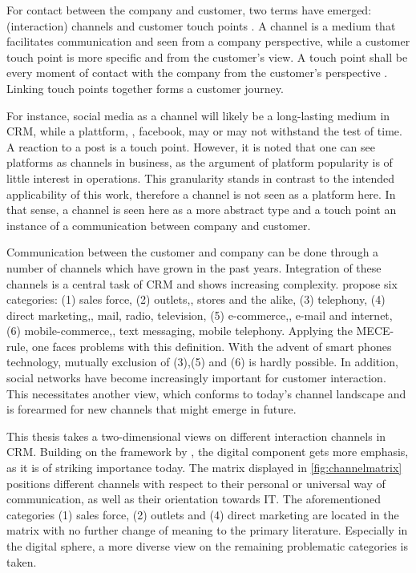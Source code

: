 		 For contact between the company and customer, two terms have emerged: (interaction) channels and customer touch points \citep{Leuer2011}. A channel is a medium that facilitates communication and seen from a company perspective, while a customer touch point is more specific and from the customer's view. A touch point shall be every moment of contact with the company from the customer's perspective \citep{Zomerdijk_2010}. Linking touch points together forms a customer journey. 
		 
		 For instance, social media as a channel will likely be a long-lasting medium in CRM, while a plattform, \ie, facebook, may or may not withstand the test of time. A reaction to a post is a touch point. 
		 However, it is noted that one can see platforms as channels in business, as the argument of platform popularity is of little interest in operations. This granularity stands in contrast to the intended applicability of this work, therefore a channel is  not seen as a platform here. 
		 In that sense, a channel is seen here as a more abstract type and a touch point an instance of a communication between company and customer. 
		
		Communication between the customer and company can be done through a number of channels which have grown in the past years. Integration of these channels is a central task of CRM and shows increasing complexity. \cite{paynefrow2005} propose six categories: (1) sales force, (2) outlets,\ie, stores and the alike, (3) telephony, (4) direct marketing,\ie, mail, radio, television, (5) e-commerce,\ie, e-mail and internet, (6) mobile-commerce,\ie, text messaging, mobile telephony. Applying the \acrfull{MECE}-rule, one faces problems with this definition. With the advent of smart phones technology, mutually exclusion of (3),(5) and (6) is hardly possible. In addition, social networks have become increasingly important for customer interaction. This necessitates another view, which conforms to today's channel landscape and is forearmed for new channels that might emerge in future. 
		
		This thesis takes a two-dimensional views on different interaction channels in CRM. Building on the framework by \citeauthor{paynefrow2005}, the digital component gets more emphasis, as it is of striking importance today. The matrix displayed in \ref{fig:channelmatrix} positions different channels with respect to their personal or universal way of communication, as well as their orientation towards IT. The aforementioned categories (1) sales force, (2) outlets and (4) direct marketing are located in the matrix with no further change of meaning to the primary literature. Especially in the digital sphere, a more diverse view on the remaining problematic categories is taken.
		
